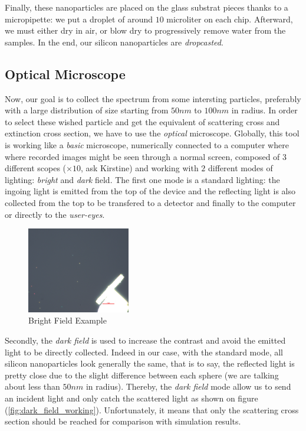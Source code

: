 \documentclass{article}
\numberwithin{equation}{section}
\begin{document}
Finally, these nanoparticles are placed on the glass substrat pieces thanks to a micropipette: we put a droplet of around $10$ microliter on each chip. Afterward, we must either dry in air, or blow dry to progressively remove water from the samples. In the end, our silicon nanoparticles are \textit{dropcasted}.

\subsection{Optical Microscope}

Now, our goal is to collect the spectrum from some intersting particles, preferably with a large distribution of size starting from $50 nm$ to $100 nm$ in radius. In order to select these wished particle and get the equivalent of scattering cross and extinction cross section, we have to use the \textit{optical} microscope. Globally, this tool is working like a \textit{basic} microscope, numerically connected to a computer where where recorded images might be seen through a normal screen, composed of $3$ different scopes ($\times 10$, ask Kirstine) and working with $2$ different modes of lighting: \textit{bright} and \textit{dark} field. The first one mode is a standard lighting: the ingoing light is emitted from the top of the device and the reflecting light is also collected from the top to be transfered to a detector and finally to the computer or directly to the \textit{user-eyes}.
\begin{figure}[h]
    \centering
    \includegraphics[width=0.4\textwidth, height=0.35\textwidth]{bright_field_ex.png}
    \caption{Bright Field Example}
    \label{fig:bright_field_ex}
\end{figure}
Secondly, the \textit{dark field} is used to increase the contrast and avoid the emitted light to be directly collected. Indeed in our case, with the standard mode, all silicon nanoparticles look generally the same, that is to say, the reflected light is pretty close due to the slight difference between each sphere (we are talking about less than $50 nm$ in radius). Thereby, the \textit{dark field} mode allow us to send an incident light and only catch the scattered light as shown on figure (\ref{fig:dark_field_working}). Unfortunately, it means that only the scattering cross section should be reached for comparison with simulation results.
\end{document}
